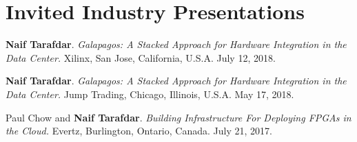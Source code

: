 \section{\sc Invited Industry Presentations}

\onecol
{
  \textbf{Naif Tarafdar}. 
  \textit{Galapagos: A Stacked Approach for Hardware Integration in the Data Center.}
  Xilinx, San Jose, California, U.S.A. July 12, 2018. 
}

\onecol
{
  \textbf{Naif Tarafdar}. 
  \textit{Galapagos: A Stacked Approach for Hardware Integration in the Data Center.}
  Jump Trading, Chicago, Illinois, U.S.A. May 17, 2018. 
}


\onecol
{
  Paul Chow and \textbf{Naif Tarafdar}. 
  \textit{Building Infrastructure For Deploying FPGAs in the Cloud.}
  Evertz, Burlington, Ontario, Canada. July 21, 2017. 
}

